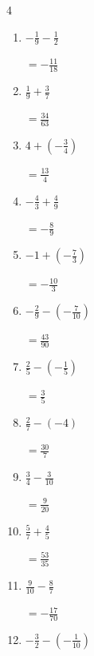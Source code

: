 \begin{multicols}{4}
\begin{enumerate}
        $\displaystyle =-\frac{11}{4}$

  \item $\displaystyle -\frac{1}{9} - \frac{1}{2}$

        $\displaystyle =-\frac{11}{18}$

  \item $\displaystyle \frac{1}{9} + \frac{3}{7}$

        $\displaystyle =\frac{34}{63}$

\columnbreak %

  \item $\displaystyle 4 + \left(-\frac{3}{4}\right)$

        $\displaystyle =\frac{13}{4}$

  \item $\displaystyle -\frac{4}{3} + \frac{4}{9}$

        $\displaystyle =-\frac{8}{9}$

  \item $\displaystyle -1 + \left(-\frac{7}{3}\right)$

        $\displaystyle =-\frac{10}{3}$

  \item $\displaystyle -\frac{2}{9} - \left(-\frac{7}{10}\right)$

        $\displaystyle =\frac{43}{90}$

  \item $\displaystyle \frac{2}{5} - \left(-\frac{1}{5}\right)$

        $\displaystyle =\frac{3}{5}$

  \item $\displaystyle \frac{2}{7} - \left(-4\right)$

        $\displaystyle =\frac{30}{7}$

  \item $\displaystyle \frac{3}{4} - \frac{3}{10}$

        $\displaystyle =\frac{9}{20}$

  \item $\displaystyle \frac{5}{7} + \frac{4}{5}$

        $\displaystyle =\frac{53}{35}$

  \item $\displaystyle \frac{9}{10} - \frac{8}{7}$

        $\displaystyle =-\frac{17}{70}$

  \item $\displaystyle -\frac{3}{2} - \left(-\frac{1}{10}\right)$


\end{enumerate}
\end{multicols}
